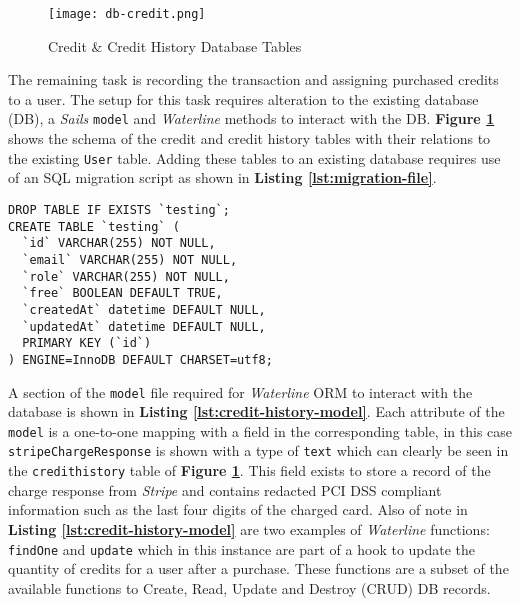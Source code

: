 \begin{figure}[!hbt]
  \centering
 	\texttt{[image: db-credit.png]}
  \caption{Credit \& Credit History Database Tables}
 	\label{fig:db-credit}
\end{figure}

The remaining task is recording the transaction and assigning purchased credits to a user. The setup for this task requires alteration to the existing database (DB), a \textit{Sails} \texttt{model} and \textit{Waterline} methods to interact with the DB. \textbf{Figure \ref{fig:db-credit}} shows the schema of the credit and credit history tables with their relations to the existing \texttt{User} table. Adding these tables to an existing database requires use of an SQL migration script as shown in \textbf{Listing \ref{lst:migration-file}}.\\

\hspace{0.1\textwidth}
\begin{minipage}{.72\textwidth}
\begin{listing}[H]
\begin{verbatim}
DROP TABLE IF EXISTS `testing`;
CREATE TABLE `testing` (
  `id` VARCHAR(255) NOT NULL,
  `email` VARCHAR(255) NOT NULL,
  `role` VARCHAR(255) NOT NULL,
  `free` BOOLEAN DEFAULT TRUE,
  `createdAt` datetime DEFAULT NULL,
  `updatedAt` datetime DEFAULT NULL,
  PRIMARY KEY (`id`)
) ENGINE=InnoDB DEFAULT CHARSET=utf8;

\end{verbatim}
\label{lst:migration-file}
\end{listing}
\end{minipage}
\hspace{0.1\textwidth}
\vspace{0.3cm}

A section of the \texttt{model} file required for \textit{Waterline} ORM to interact with the database is shown in \textbf{Listing \ref{lst:credit-history-model}}. Each attribute of the \texttt{model} is a one-to-one mapping with a field in the corresponding table, in this case \texttt{stripeChargeResponse} is shown with a type of \texttt{text} which can clearly be seen in the \texttt{credithistory} table of \textbf{Figure \ref{fig:db-credit}}. This field exists to store a record of the charge response from \textit{Stripe} and contains redacted PCI DSS compliant information such as the last four digits of the charged card. Also of note in \textbf{Listing \ref{lst:credit-history-model}} are two examples of \textit{Waterline} functions: \texttt{findOne} and \texttt{update} which in this instance are part of a hook to update the quantity of credits for a user after a purchase. These functions are a subset of the available functions to Create, Read, Update and Destroy (CRUD) DB records.

